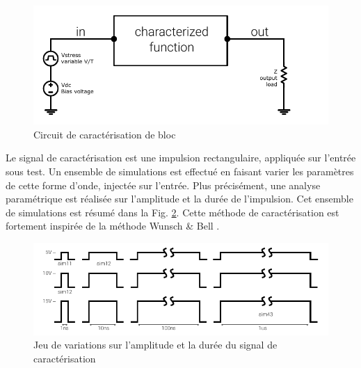 \begin{figure}[!h]
  \centering
  \includegraphics{src/1/figures/characterization_setup.pdf}
  \caption{Circuit de caractérisation de bloc}
  \label{block_function_cz}
\end{figure}

Le signal de caractérisation est une impulsion rectangulaire, appliquée sur l'entrée sous test.
Un ensemble de simulations est effectué en faisant varier les paramètres de cette forme d'onde, injectée sur l'entrée.
Plus précisément, une analyse paramétrique est réalisée sur l'amplitude et la durée de l'impulsion.
Cet ensemble de simulations est résumé dans la Fig. \ref{set_input_signals}.
Cette méthode de caractérisation est fortement inspirée de la méthode Wunsch & Bell \cite{wunsch-bell}.

\begin{figure}[!h]
  \centering
  \includegraphics{src/1/figures/time_domain_cz_curves.pdf}
  \caption{Jeu de variations sur l'amplitude et la durée du signal de caractérisation}
  \label{set_input_signals}
\end{figure}

